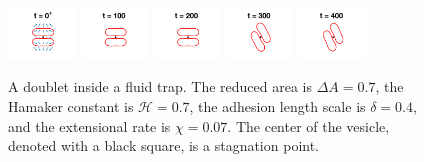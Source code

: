 \documentclass[prf,superscriptaddress,showpacs]{revtex4-1}
\begin{document}
\begin{figure}[htp]
  \includegraphics[width = 0.16\textwidth,trim={4cm 2cm 4cm 1cm},clip]{figs/extensional_adR4em1adS7em1Chi7em2_ra070_image01.png}
  \includegraphics[width = 0.16\textwidth,trim={4cm 2cm 4cm 1cm},clip]{figs/extensional_adR4em1adS7em1Chi7em2_ra070_image02.png}
  \includegraphics[width = 0.16\textwidth,trim={4cm 2cm 4cm 1cm},clip]{figs/extensional_adR4em1adS7em1Chi7em2_ra070_image03.png}
  \includegraphics[width = 0.16\textwidth,trim={4cm 2cm 4cm 1cm},clip]{figs/extensional_adR4em1adS7em1Chi7em2_ra070_image04.png}
  \includegraphics[width = 0.16\textwidth,trim={4cm 2cm 4cm 1cm},clip]{figs/extensional_adR4em1adS7em1Chi7em2_ra070_image05.png}
  \caption{\label{fig:extensional2} A doublet inside a fluid trap.  The
  reduced area is $\Delta A = 0.7$, the Hamaker constant is $\mathcal{H}
  = 0.7$, the adhesion length scale is $\delta = 0.4$, and the
  extensional rate is $\chi = 0.07$.  The center of the vesicle, denoted
  with a black square, is a stagnation point.}


\end{figure}
\end{document}

